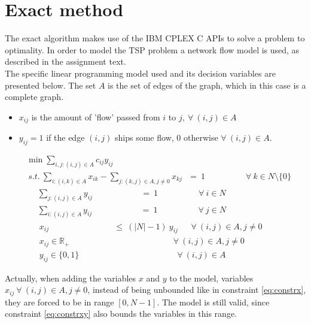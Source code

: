
\section{Exact method}
\label{chap:cplexm}
The exact algorithm makes use of the IBM CPLEX C APIs to solve a problem to optimality. In order to model the TSP problem a network flow model is used, as described in the assignment text. \\
The specific linear programming model used and its decision variables are presented below. The set $A$ is the set of edges of the graph, which in this case is a complete graph.
\begin{itemize}
	\item $x_{ij}$ is the amount of 'flow' passed from $i$ to $j,~\forall~(i,j)\in A$
	\item $y_{ij} = 1$ if the edge $(i,j)$ ships some flow, $0$ otherwise $\forall~(i,j)\in A$.
\end{itemize}
\begin{align}
	&\min \sum\limits_{i,j:(i,j)\in A} c_{ij}y_{ij}\\
	&~s.t.~\sum_{i:(i,k)\in A}x_{ik} - \sum_{j:(k,j)\in A, j\ne 0}x_{kj}~~~=~1~~~~~~~~~~~~~~~~~~~~~~\forall~k \in N \setminus \{0\}\label{eq:flow}\\
	&~~~~~~\sum_{j:(i,j)\in A} y_{ij}~~~~~~~~~~~~~~~~~~~~~~~~~~=~1~~~~~~~~~~~~~~~~~~~~~~\forall~i \in N \label{eq:sumi}\\
	&~~~~~~\sum_{i:(i,j)\in A} y_{ij}~~~~~~~~~~~~~~~~~~~~~~~~~~=~1~~~~~~~~~~~~~~~~~~~~~~\forall~j \in N \label{eq:sumj}\\ 
	&~~~~~~~x_{ij}~~~~~~~~~~~~~~~~~~~~~~~~~~~~~~~~~~~\le~(|N|-1)~y_{ij}~~~~~~~\forall~(i,j) \in A,j\ne 0 \label{eq:constrxy}\\
	&~~~~~~~x_{ij} \in \mathbb{R}_+~~~~~~~~~~~~~~~~~~~~~~~~~~~~~~~~~~~~~~~~~~~~~~~~~~~~~~~~\forall~(i,j) \in A,j\ne 0 \label{eq:constrx}\\
	&~~~~~~~y_{ij} \in \{0,1\}~~~~~~~~~~~~~~~~~~~~~~~~~~~~~~~~~~~~~~~~~~~~~~~~~~~~~\forall~(i,j) \in A
\end{align}

Actually, when adding the variables $x$ and $y$ to the model, variables $x_{ij}~\forall~(i,j) \in A,j\ne 0$, instead of being unbounded like in constraint \ref{eq:constrx}, they are forced to be in range $[0,N-1]$. The model is still valid, since constraint \ref{eq:constrxy} also bounds the variables in this range.

